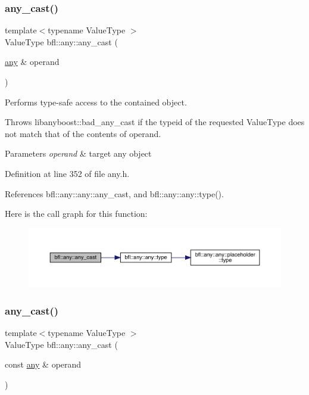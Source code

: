 \subsubsection{\texorpdfstring{any\+\_\+cast()}{any\_cast()}\hspace{0.1cm}{\footnotesize\ttfamily [3/5]}}
{\footnotesize\ttfamily template$<$typename Value\+Type $>$ \\
Value\+Type bfl\+::any\+::any\+\_\+cast (\begin{DoxyParamCaption}\item[{\mbox{\hyperlink{classbfl_1_1any_1_1any}{any}} \&}]{operand }\end{DoxyParamCaption})}



Performs type-\/safe access to the contained object. 

Throws libanyboost\+::bad\+\_\+any\+\_\+cast if the typeid of the requested Value\+Type does not match that of the contents of operand.


\begin{DoxyParams}{Parameters}
{\em operand} & target any object \\
\hline
\end{DoxyParams}


Definition at line 352 of file any.\+h.



References bfl\+::any\+::any\+::any\+\_\+cast, and bfl\+::any\+::any\+::type().

Here is the call graph for this function\+:
\nopagebreak
\begin{figure}[H]
\begin{center}
\leavevmode
\includegraphics[width=350pt]{namespacebfl_1_1any_a2b5d2dbb287832915598b087083885be_cgraph}
\end{center}
\end{figure}
\mbox{\label{namespacebfl_1_1any_aa10ebe32454df7c7769d7391c72f2230}} 
\subsubsection{\texorpdfstring{any\+\_\+cast()}{any\_cast()}\hspace{0.1cm}{\footnotesize\ttfamily [4/5]}}
{\footnotesize\ttfamily template$<$typename Value\+Type $>$ \\
Value\+Type bfl\+::any\+::any\+\_\+cast (\begin{DoxyParamCaption}\item[{const \mbox{\hyperlink{classbfl_1_1any_1_1any}{any}} \&}]{operand }\end{DoxyParamCaption})\hspace{0.3cm}{\ttfamily [inline]}}



